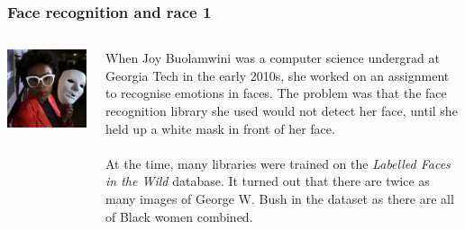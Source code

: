 \documentclass{beamer}
\begin{document}


\begin{frame}
\frametitle{Face recognition and race 1}
\begin{columns}
    \begin{column}{0.3\textwidth}
        \includegraphics[width=1\textwidth]{./images/joy_buolamwini.jpg}
    \end{column}
    \begin{column}{0.7\textwidth}
        When Joy Buolamwini was a computer science undergrad at Georgia Tech in the early 2010s, she worked on an assignment to recognise emotions in faces. The problem was that the face recognition library she used would not detect her face, until she held up a white mask in front of her face.
        \\~\\
        At the time, many libraries were trained on the \emph{Labelled Faces in the Wild} database. It turned out that there are twice as many images of George W. Bush in the dataset as there are all of Black women combined.
    \end{column}
\end{columns}
\end{frame}
\end{document}
